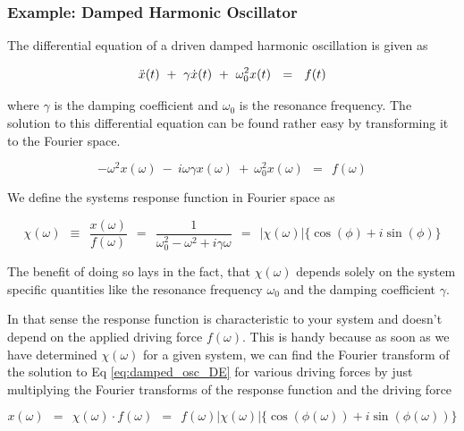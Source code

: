\documentclass[10pt]{report}
\numberwithin{equation}{chapter}
\newcommand{\refEq}[1]{
  Eq  \ref{#1}
}
\begin{document}
\subsubsection{Example: Damped Harmonic Oscillator}

The differential equation of a driven damped harmonic oscillation is given as

\begin{equation} \label{eq:damped_osc_DE}
  \Ddot{x}(t) ~+~ \gamma \dot{x}(t) ~+~ \omega_0^2 x(t) ~~=~~ f(t)
\end{equation}

where $\gamma$ is the damping coefficient and $\omega_0$ is the resonance frequency.
The solution to this differential equation can be found rather easy by transforming it to the Fourier space.

\begin{equation}
  -\omega^2 x(\omega) ~-~ i \omega \gamma x(\omega) ~+~ \omega_0^2 x(\omega) ~~=~~ f(\omega)
\end{equation}


We define the systems response function in Fourier space as

\begin{equation} \label{eq:damped_osc_response}
  \chi(\omega) ~~\equiv~~ \frac{x(\omega)}{f(\omega)} ~~=~~ \frac{1}{\omega_0^2 - \omega^2 + i\gamma\omega} ~~=~~ | \chi(\omega)| \{\cos(\phi) + i\sin(\phi) \}
\end{equation}

The benefit of doing so lays in the fact, that $\chi(\omega)$ depends solely on the system specific 	quantities like the resonance frequency $\omega_0$ and the damping coefficient $\gamma$.

In that sense the response function is characteristic to your system and doesn't depend on the applied driving force $f(\omega)$. This is handy because as soon as we have determined $\chi(\omega)$ for a given system, we can find the Fourier transform of the solution to \refEq{eq:damped_osc_DE} for various driving forces by just multiplying the Fourier transforms of the response function and the driving force 

\begin{equation}
  x(\omega) ~~=~~ \chi(\omega) \cdot f(\omega) 
  ~~=~~ f(\omega) |\chi(\omega)| \{\cos(\phi(\omega)) +i \sin(\phi(\omega))\}
\end{equation}
\end{document}
